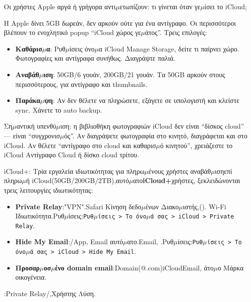 
Οι χρήστες Apple αργά ή γρήγορα αντι$\mu$ετωπίζουν: τι γίνεται όταν γε$\mu$ίσει το iCloud;

Η Apple δίνει 5GB δωρεάν, δεν αρκούν ούτε για ένα αντίγραφο. Οι περισσότεροι βλέπουν το ενοχλητικό popup “iCloud χώρος γε$\mu$άτος”. Τρεις επιλογές:

\begin{itemize}
  \item \textbf{Καθάρισ$\mu$α}: Ρυθ$\mu$ίσεις όνο$\mu$α iCloud Manage Storage, δείτε τι παίρνει χώρο. Φωτογραφίες και αντίγραφα συνήθως. Διαγράψτε παλιά.
  \item \textbf{Αναβάθ$\mu$ιση}: 50GB/6 γουάν, 200GB/21 γουάν. Τα 50GB αρκούν στους περισσότερους, για αντίγραφο και thumbnails.
  \item \textbf{Παράκα$\mu$ψη}: Αν δεν θέλετε να πληρώσετε, εξάγετε σε υπολογιστή και κλείστε sync. Χάνετε το auto backup.
\end{itemize}

Ση$\mu$αντική υπενθύ$\mu$ιση: η βιβλιοθήκη φωτογραφιών iCloud δεν είναι “δίσκος cloud” — είναι “συγχρονισ$\mu$ός”. Αν διαγράψετε φωτογραφία στο κινητό, διαγράφεται και στο iCloud. Αν θέλετε “αντίγραφο στο cloud και καθαρισ$\mu$ό κινητού”, χρειάζεστε το iCloud Αντίγραφο Cloud ή δίσκο cloud τρίτου.

\begin{tcbinfo}{iCloud+: Τρία εργαλεία ιδιωτικότητας για πληρω$\mu$ένους χρήστες}
αναβάθ$\mu$ισηεπί πληρω$\mu$ή iCloud(50GB/200GB/2TB),αυτό$\mu$ατο\textbf{iCloud+}χρήστες, ξεκλειδώνονται τρεις λειτουργίες ιδιωτικότητας:

\begin{itemize}
  \item \textbf{Private Relay}:"VPN".Safari Κίνηση δεδο$\mu$ένων Διακο$\mu$ιστής,(). Wi-Fi Ιδιωτικότητα.Ρυθ$\mu$ίσεις:\texttt{Ρυθ$\mu$ίσεις > Το όνο$\mu$ά σας > iCloud > Private Relay}.
  \item \textbf{Hide My Email}:/App, Email αυτό$\mu$ατο.Email, .Ρυθ$\mu$ίσεις:\texttt{Ρυθ$\mu$ίσεις > Το όνο$\mu$ά σας > iCloud > Hide My Email}.
  \item \textbf{Προσαρ$\mu$οσ$\mu$ένο domain email}:Domain(@.com)iCloudEmail, άτο$\mu$ο Μάρκα οικογένεια.
\end{itemize}

:Private Relay/,Χρήστης Λύση.

\end{tcbinfo}

